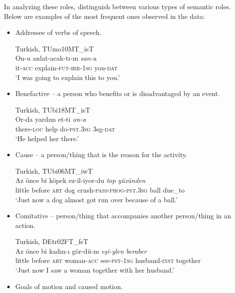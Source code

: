 In analyzing these roles, \citet{HaigEtAl2024} distinguish between various types of semantic roles. Below are examples of the most frequent ones observed in the data:

\begin{itemize}

\item Addressee of verbs of speech.

\ea%
  \label{ex:key:45} Turkish, TUmo10MT\_isT \\
     \gll On-u  anlat-acak-tı-m  \textit{san-a} \\
it-\textsc{acc}  explain\textsc{-fut-irr-1sg}  you-\textsc{dat}\\
\glt ‘I was going to explain this to you.’
  \z

\item Benefactive -- a person who benefits or is disadvantaged by an event.

\ea%
  \label{ex:key:46} Turkish, TUbi18MT\_isT \\
     \gll Or-da    yardım    et-ti    \textit{on-a} \\
there\textsc{-loc}  help    do-\textsc{pst.3sg}  3sg-\textsc{dat}\\
\glt‘He helped her there.’
  \z
\newpage
\item Cause -- a person/thing that is the reason for the activity.

\ea%
  \label{ex:key:47} Turkish, TUbi06MT\_iwT \\
     \gll Az  önce  bi  köpek  ez-il-iyor-du   \textit{top} \textit{yüzünden} \\
little  before  \textsc{art}  dog  crush-\textsc{pass-prog-pst.3sg}  ball  due\_to \\
\glt ‘Just now a dog almost got run over because of a ball.’
  \z


\item Comitative -- person/thing that accompanies another person/thing in an action.


\ea%
  \label{ex:key:48} Turkish, DEtr02FT\_fsT \\
     \gll Az   önce  bi  kadın-ı    gör-dü-m  \textit{eşi-ylen}    \textit{beraber} \\
little  before  \textsc{art}  woman-\textsc{acc}  see-\textsc{pst-1sg}  husband-\textsc{inst}    together\\
\glt ‘Just now I saw a woman together with her husband.’
  \z

\item Goals of motion and caused motion.


\end{itemize}
